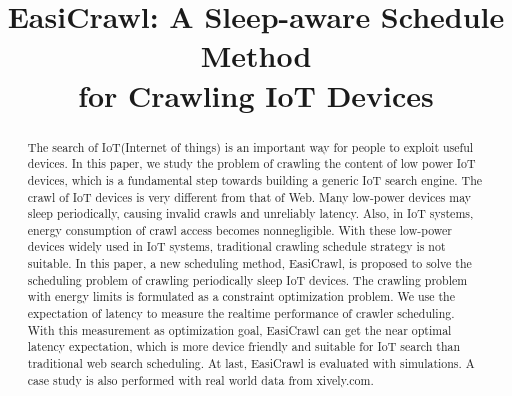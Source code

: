 \documentclass[conference]{IEEEtran}
\begin{document}
%
\title{EasiCrawl: A Sleep-aware Schedule Method \\for Crawling IoT Devices}

\author{
}

\maketitle


\begin{abstract}
The search of IoT(Internet of things) is an important way for people to exploit useful devices. In this paper, we study the problem of crawling the content of low power IoT devices, which is a fundamental step towards building a generic IoT search engine.
The crawl of IoT devices is very different from that of Web. Many low-power devices may sleep periodically, causing invalid crawls and unreliably latency. Also, in IoT systems, energy consumption of crawl access becomes nonnegligible.
With these low-power devices widely used in IoT systems, traditional crawling schedule strategy is not suitable.
In this paper, a new scheduling method, EasiCrawl, is proposed to solve the scheduling problem of crawling periodically sleep IoT devices. The crawling problem with energy limits is formulated as a constraint optimization problem. We use the expectation of latency to measure the realtime performance of crawler scheduling. With this measurement as optimization goal, EasiCrawl can get the near optimal latency expectation, which is more device friendly and suitable for IoT search than traditional web search scheduling.
At last, EasiCrawl is evaluated with simulations. A case study is also performed with real world data from xively.com.
\end{abstract}
\end{document}
